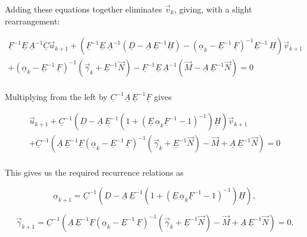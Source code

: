 \documentclass[11pt]{amsart}
\begin{document}
Adding these equations together eliminates $\vec{v}_{k}$, giving, with a slight rearrangement:

\begin{multline} \label{eq:IIIf}
 \underline{F}^{-1} \underline{E} \, \underline{A}^{-1} \underline{C} \vec{u}_{k+1}  + \left(  \underline{F}^{-1} \underline{E} \, \underline{A}^{-1} \left( \underline{D} - \underline{A} \, \underline{E}^{-1} \underline{H} \right)    -  \left(   \underline{\alpha}_{k}  -  \underline{E}^{-1} \, \underline{F}  \right)^{-1} \underline{E}^{-1} \, \underline{H}    \right) \vec{v}_{k+1}  \\
 +   \left(   \underline{\alpha}_{k}  -  \underline{E}^{-1} \, \underline{F}  \right)^{-1}  \left(\vec{\gamma}_{k}  +  \underline{E}^{-1} \vec{N} \right)   -  \underline{F}^{-1} \underline{E} \, \underline{A}^{-1}  \left(\vec{M}  -  \underline{A} \, \underline{E}^{-1} \vec{N}  \right)  =  0
\end{multline}
\\

Multiplying from the left by $\underline{C}^{-1} \underline{A} \, \underline{E}^{-1} \underline{F}$ gives

\begin{multline} \label{eq:IIIg}
\vec{u}_{k+1}  + \underline{C}^{-1}  \left(  \underline{D}   -  \underline{A} \, \underline{E}^{-1}  \left(  1 + \left( \underline{E} \, \underline{\alpha}_{k} \underline{F}^{-1}  - 1 \right)^{-1} \right) \underline{H}    \right) \vec{v}_{k+1}  \\
 +   \underline{C}^{-1}  \left(  \underline{A} \, \underline{E}^{-1} \underline{F} \left(   \underline{\alpha}_{k}  -  \underline{E}^{-1} \, \underline{F}  \right)^{-1}  \left(\vec{\gamma}_{k}  +  \underline{E}^{-1} \vec{N} \right)   -  \vec{M}  +  \underline{A} \, \underline{E}^{-1} \vec{N}  \right)  =  0
\end{multline}
\\


This gives us the required recurrence relations as

\begin{equation} \label{eq:IIIalpha}
\underline{\alpha}_{k+1}  =  \underline{C}^{-1}  \left(  \underline{D}   -  \underline{A} \, \underline{E}^{-1}  \left(  1 + \left( \underline{E} \, \underline{\alpha}_{k} \underline{F}^{-1}  - 1 \right)^{-1} \right) \underline{H}    \right) ,
\end{equation} 

\begin{equation} \label{eq:IIIgamma}
\vec{\gamma}_{k+1}  =   \underline{C}^{-1}  \left(  \underline{A} \, \underline{E}^{-1} \underline{F} \left(   \underline{\alpha}_{k}  -  \underline{E}^{-1} \, \underline{F}  \right)^{-1}  \left(\vec{\gamma}_{k}  +  \underline{E}^{-1} \vec{N} \right)   -  \vec{M}  +  \underline{A} \, \underline{E}^{-1} \vec{N}  \right)  =  0.
\end{equation} 
\\
\end{document}
